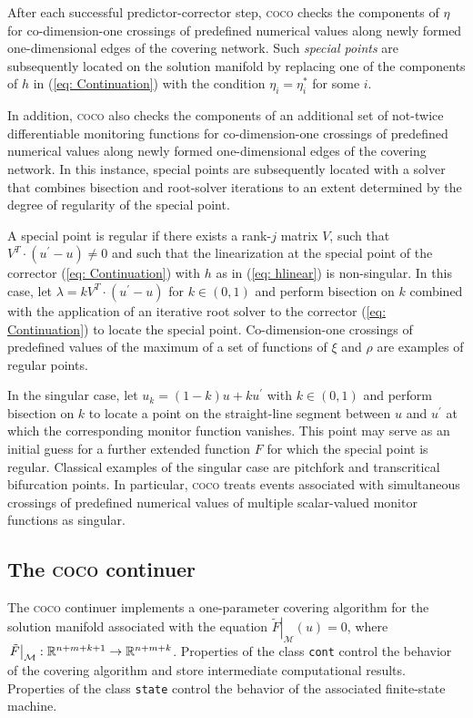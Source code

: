 \documentclass{article}
\begin{document}
After each successful predictor-corrector step, \textsc{coco} checks the
components of $\eta $ for co-dimension-one crossings of predefined numerical
values along newly formed one-dimensional edges of the covering network.
Such \emph{special points} are subsequently located on the solution manifold
by replacing one of the components of $h$ in (\ref{eq: Continuation}) with
the condition $\eta _{i}=\eta _{i}^{\ast }$ for some $i$.

In addition, \textsc{coco} also checks the components of an additional set
of not-twice differentiable monitoring functions for co-dimension-one
crossings of predefined numerical values along newly formed one-dimensional
edges of the covering network. In this instance, special points are
subsequently located with a solver that combines bisection and root-solver
iterations to an extent determined by the degree of regularity of the
special point.

A special point is regular if there exists a rank-$j$ matrix $V$, such that $%
V^{T}\cdot \left( u^{\prime }-u\right) \neq 0$ and such that the
linearization at the special point of the corrector (\ref{eq: Continuation})
with $h$ as in (\ref{eq: hlinear}) is non-singular. In this case, let $%
\lambda =kV^{T}\cdot \left( u^{\prime }-u\right) $ for $k\in \left(
0,1\right) $ and perform bisection on $k$ combined with the application of
an iterative root solver to the corrector (\ref{eq: Continuation}) to locate
the special point. Co-dimension-one crossings of predefined values of the
maximum of a set of functions of $\xi $ and $\rho $ are examples of regular
points.

In the singular case, let $u_{k}=\left( 1-k\right) u+ku^{\prime }$ with $%
k\in \left( 0,1\right) $ and perform bisection on $k$ to locate a point on
the straight-line segment between $u$ and $u^{\prime }$ at which the
corresponding monitor function vanishes. This point may serve as an initial
guess for a further extended function $F$ for which the special point is
regular. Classical examples of the singular case are pitchfork and
transcritical bifurcation points. In particular, \textsc{coco} treats events
associated with simultaneous crossings of predefined numerical values of
multiple scalar-valued monitor functions as singular.

\subsection{The \textsc{coco} continuer}

The \textsc{coco} continuer implements a one-parameter covering algorithm
for the solution manifold associated with the equation $\left. \tilde{F}%
\right| _{\mathcal{M}}\left( u\right) =0$, where $\left. \tilde{F}\right| _{%
\mathcal{M}}:\mathbb{R}^{n+m+k+1}\rightarrow \mathbb{R}^{n+m+k}$. Properties
of the class \texttt{cont} control the behavior of the covering algorithm
and store intermediate computational results. Properties of the class 
\texttt{state} control the behavior of the associated finite-state machine.
\end{document}
